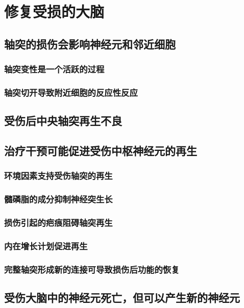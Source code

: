 \chapter{修复受损的大脑}


\section{轴突的损伤会影响神经元和邻近细胞}
\subsection{轴突变性是一个活跃的过程}
\subsection{轴突切开导致附近细胞的反应性反应}

\section{受伤后中央轴突再生不良}

\section{治疗干预可能促进受伤中枢神经元的再生}
\subsection{环境因素支持受伤轴突的再生}
\subsection{髓磷脂的成分抑制神经突生长}
\subsection{损伤引起的疤痕阻碍轴突再生}
\subsection{内在增长计划促进再生}
\subsection{完整轴突形成新的连接可导致损伤后功能的恢复}

\section{受伤大脑中的神经元死亡，但可以产生新的神经元}

